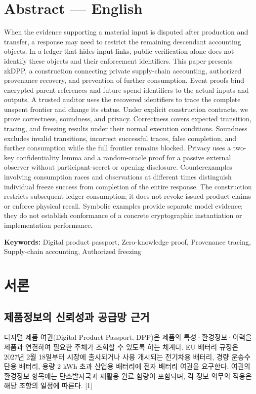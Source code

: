 \documentclass[11pt,a4paper]{article}
\begin{document}
\section*{Abstract — English}
When the evidence supporting a material input is disputed after production and transfer, a response may need to restrict the remaining descendant accounting objects.
In a ledger that hides input links, public verification alone does not identify these objects and their enforcement identifiers.
This paper presents zkDPP, a construction connecting private supply-chain accounting, authorized provenance recovery, and prevention of further consumption.
Event proofs bind encrypted parent references and future spend identifiers to the actual inputs and outputs.
A trusted auditor uses the recovered identifiers to trace the complete unspent frontier and change its status.
Under explicit construction contracts, we prove correctness, soundness, and privacy.
Correctness covers expected transition, tracing, and freezing results under their normal execution conditions.
Soundness excludes invalid transitions, incorrect successful traces, false completion, and further consumption while the full frontier remains blocked.
Privacy uses a two-key confidentiality lemma and a random-oracle proof for a passive external observer without participant-secret or opening disclosure.
Counterexamples involving consumption races and observations at different times distinguish individual freeze success from completion of the entire response.
The construction restricts subsequent ledger consumption; it does not revoke issued product claims or enforce physical recall.
Symbolic examples provide separate model evidence; they do not establish conformance of a concrete cryptographic instantiation or implementation performance.

\textbf{Keywords:} Digital product passport, Zero-knowledge proof, Provenance tracing, Supply-chain accounting, Authorized freezing

\clearpage
\section{서론}
\subsection{제품정보의 신뢰성과 공급망 근거}
디지털 제품 여권(Digital Product Passport, DPP)은 제품의 특성·환경정보·이력을 제품과 연결하여 필요한 주체가 조회할 수 있도록 하는 체계다.
EU 배터리 규정은 2027년 2월 18일부터 시장에 출시되거나 사용 개시되는 전기차용 배터리, 경량 운송수단용 배터리, 용량 2 kWh 초과 산업용 배터리에 전자 배터리 여권을 요구한다.
여권의 환경정보 항목에는 탄소발자국과 재활용 원료 함량이 포함되며, 각 정보 의무의 적용은 해당 조항의 일정에 따른다. [1]
\end{document}
